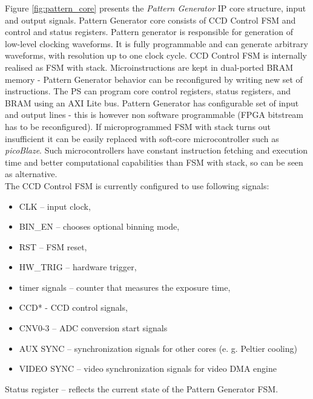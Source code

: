 Figure \ref{fig:pattern_core} presents the \emph{Pattern Generator} IP core structure, input and output signals. Pattern Generator core consists of CCD Control FSM and control and status registers.  Pattern generator is responsible for generation of low-level clocking waveforms. It is fully programmable and can generate arbitrary waveforms, with resolution up to one clock cycle. CCD Control FSM is internally realised as FSM with stack. Microinstructions are kept in dual-ported BRAM memory - Pattern Generator behavior can be reconfigured by writing new set of instructions. The PS can program core control registers, status registers, and BRAM using an AXI Lite bus. Pattern Generator has configurable set of input and output lines - this is however non  software programmable (FPGA bitstream has to be reconfigured). If microprogrammed FSM with stack turns out insufficient it can be easily replaced with soft-core microcontroller such as \emph{picoBlaze}. Such microcontrollers have constant instruction fetching and execution time and better computational capabilities than FSM with stack, so can be seen as alternative. \\
The CCD Control FSM is currently configured to use following signals: 
\begin{itemize}
\item CLK – input clock,
\item BIN\_EN – chooses optional binning mode, 
\item RST – FSM reset, 
\item HW\_TRIG – hardware trigger, 
\item timer signals – counter that measures the exposure time,
\item CCD* - CCD control signals,
\item CNV0-3 – ADC conversion start signals
\item AUX SYNC – synchronization signals for other cores (e. g. Peltier cooling)
\item VIDEO SYNC – video synchronization signals for video DMA engine
\end{itemize}

Status register – reflects the current state of the Pattern Generator FSM.

